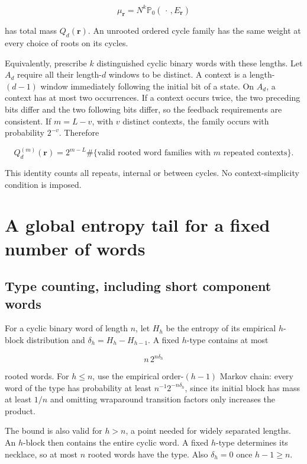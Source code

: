 \documentclass[11pt]{article}
\theoremstyle{remark}
\begin{document}
\[
 \mu_{\mathbf r}=N^k\mathbb P_0(\,\cdot\,,E_{\mathbf r})
\]

has total mass \(Q_d(\mathbf r)\). An unrooted ordered cycle family has
the same weight at every choice of roots on its cycles.

Equivalently, prescribe \(k\) distinguished cyclic binary words with
these lengths. Let \(A_d\) require all their length-\(d\) windows to be
distinct. A context is a length-\((d-1)\) window immediately following
the initial bit of a state. On \(A_d\), a context has at most two
occurrences. If a context occurs twice, the two preceding bits differ
and the two following bits differ, so the feedback requirements are
consistent. If \(m=L-v\), with \(v\) distinct contexts, the family
occurs with probability \(2^{-v}\). Therefore

\[
 Q_d^{(m)}(\mathbf r)
 =2^{m-L}\#\{\text{valid rooted word families with }m\text{ repeated contexts}\}.
 \tag{2.1}\label{eq:2.1}
\]

This identity counts all repeats, internal or between cycles. No
context-simplicity condition is imposed.

\section{A global entropy tail for a fixed number of
words}\label{a-global-entropy-tail-for-a-fixed-number-of-words}

\subsection{Type counting, including short component
words}\label{type-counting-including-short-component-words}

For a cyclic binary word of length \(n\), let \(H_h\) be the entropy of
its empirical \(h\)-block distribution and \(\delta_h=H_h-H_{h-1}\). A
fixed \(h\)-type contains at most

\[
 n\,2^{n\delta_h}
 \tag{3.1}\label{eq:3.1}
\]

rooted words. For \(h\le n\), use the empirical order-\((h-1)\) Markov
chain: every word of the type has probability at least
\(n^{-1}2^{-n\delta_h}\), since its initial block has mass at least
\(1/n\) and omitting wraparound transition factors only increases the
product.

The bound is also valid for \(h>n\), a point needed for widely separated
lengths. An \(h\)-block then contains the entire cyclic word. A fixed
\(h\)-type determines its necklace, so at most \(n\) rooted words have
the type. Also \(\delta_h=0\) once \(h-1\ge n\).
\end{document}
